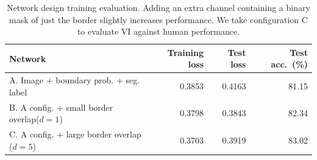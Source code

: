 \begin{table}[t]
\begin{tabular}{l rrr}
\toprule
Network & Training loss & \hspace{0.1cm}Test loss & \hspace{0.1cm}Test acc.~(\%) \\
\midrule
A. Image + boundary prob. + seg. label & 0.3853 & 0.4163 & 81.15 \\
B. A config. + small border overlap($d=1$) & 0.3798 & 0.3843 & 82.34\\
C. A config. + large border overlap ($d=5$) &  0.3703 & 0.3919 & 83.02\\
\bottomrule
\end{tabular}
\caption{Network design training evaluation. Adding an extra channel containing a binary mask of just the border slightly increases performance. We take configuration C to evaluate VI against human performance.}
\label{tab:spliterrorcorrectionperformance}
\end{table}





